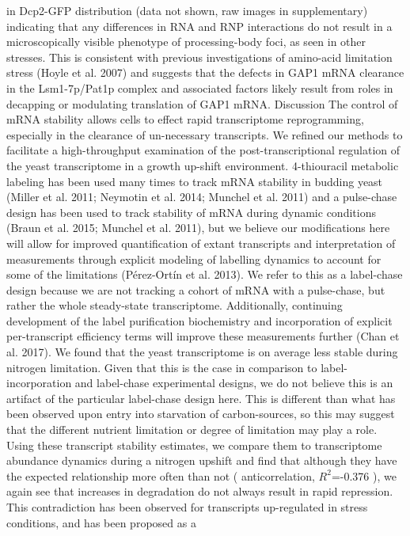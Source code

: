in Dcp2-GFP distribution (data not shown, raw images in supplementary)
indicating that any differences in RNA and RNP interactions do not
result in a microscopically visible phenotype of processing-body foci,
as seen in other stresses. This is consistent with previous
investigations of amino-acid limitation stress (Hoyle et al. 2007) and
suggests that the defects in GAP1 mRNA clearance in the Lsm1-7p/Pat1p
complex and associated factors likely result from roles in decapping
or modulating translation of GAP1 mRNA.  Discussion The control of
mRNA stability allows cells to effect rapid transcriptome
reprogramming, especially in the clearance of un-necessary
transcripts. We refined our methods to facilitate a high-throughput
examination of the post-transcriptional regulation of the yeast
transcriptome in a growth up-shift environment. 4-thiouracil metabolic
labeling has been used many times to track mRNA stability in budding
yeast (Miller et al. 2011; Neymotin et al. 2014; Munchel et al. 2011)
and a pulse-chase design has been used to track stability of mRNA
during dynamic conditions (Braun et al. 2015; Munchel et al. 2011),
but we believe our modifications here will allow for improved
quantification of extant transcripts and interpretation of
measurements through explicit modeling of labelling dynamics to
account for some of the limitations (Pérez-Ortín et al. 2013). We
refer to this as a label-chase design because we are not tracking a
cohort of mRNA with a pulse-chase, but rather the whole steady-state
transcriptome. Additionally, continuing development of the label
purification biochemistry and incorporation of explicit per-transcript
efficiency terms will improve these measurements further (Chan et al.
2017).  We found that the yeast transcriptome is on average less
stable during nitrogen limitation. Given that this is the case in
comparison to label-incorporation and label-chase experimental
designs, we do not believe this is an artifact of the particular
label-chase design here.  This is different than what has been
observed upon entry into starvation of carbon-sources, so this may
suggest that the different nutrient limitation or degree of limitation
may play a role. Using these transcript stability estimates, we
compare them to transcriptome abundance dynamics during a nitrogen
upshift and find that although they have the expected relationship
more often than not ( anticorrelation, $R^2$=-0.376 ), we again see
that increases in degradation do not always result in rapid
repression. This contradiction has been observed for transcripts
up-regulated in stress conditions, and has been proposed as a

